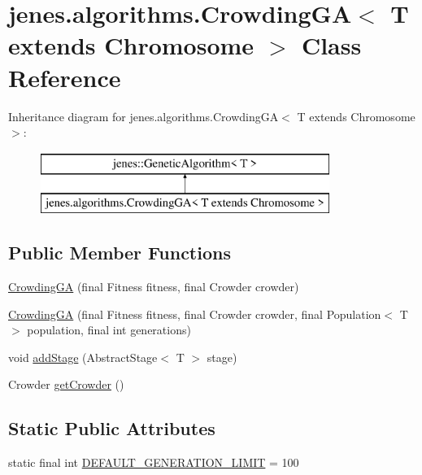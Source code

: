 \hypertarget{classjenes_1_1algorithms_1_1_crowding_g_a_3_01_t_01extends_01_chromosome_01_4}{\section{jenes.\-algorithms.\-Crowding\-G\-A$<$ T extends Chromosome $>$ Class Reference}
\label{classjenes_1_1algorithms_1_1_crowding_g_a_3_01_t_01extends_01_chromosome_01_4}
}
Inheritance diagram for jenes.\-algorithms.\-Crowding\-G\-A$<$ T extends Chromosome $>$\-:\begin{figure}[H]
\begin{center}
\leavevmode
\includegraphics[height=2.000000cm]{classjenes_1_1algorithms_1_1_crowding_g_a_3_01_t_01extends_01_chromosome_01_4}
\end{center}
\end{figure}
\subsection*{Public Member Functions}
\begin{DoxyCompactItemize}
\item 
\hyperlink{classjenes_1_1algorithms_1_1_crowding_g_a_3_01_t_01extends_01_chromosome_01_4_a5f9de70a8e431de7e0f9bbb6bb42ec1e}{Crowding\-G\-A} (final Fitness fitness, final Crowder crowder)
\item 
\hyperlink{classjenes_1_1algorithms_1_1_crowding_g_a_3_01_t_01extends_01_chromosome_01_4_ad3e5e26f962e7839e076b61efcd5704f}{Crowding\-G\-A} (final Fitness fitness, final Crowder crowder, final Population$<$ T $>$ population, final int generations)
\item 
void \hyperlink{classjenes_1_1algorithms_1_1_crowding_g_a_3_01_t_01extends_01_chromosome_01_4_ad241412becfe0073cbeb06418a1e49f3}{add\-Stage} (Abstract\-Stage$<$ T $>$ stage)
\item 
Crowder \hyperlink{classjenes_1_1algorithms_1_1_crowding_g_a_3_01_t_01extends_01_chromosome_01_4_a6cc270cedf906a0743cb743b30c2ba02}{get\-Crowder} ()
\end{DoxyCompactItemize}
\subsection*{Static Public Attributes}
\begin{DoxyCompactItemize}
\item 
static final int \hyperlink{classjenes_1_1algorithms_1_1_crowding_g_a_3_01_t_01extends_01_chromosome_01_4_afb96c2e73129293b45044998e3614c06}{D\-E\-F\-A\-U\-L\-T\-\_\-\-G\-E\-N\-E\-R\-A\-T\-I\-O\-N\-\_\-\-L\-I\-M\-I\-T} = 100
\end{DoxyCompactItemize}
